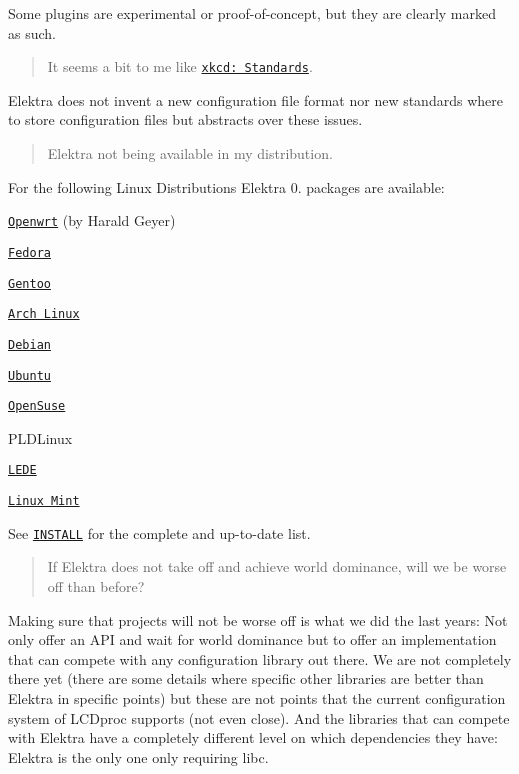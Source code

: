 Some plugins are experimental or proof-\/of-\/concept, but they are clearly marked as such.

\begin{quote}
It seems a bit to me like \href{https://xkcd.com/927/}{\tt xkcd\+: Standards}. \end{quote}


Elektra does not invent a new configuration file format nor new standards where to store configuration files but abstracts over these issues.

\begin{quote}
Elektra not being available in my distribution. \end{quote}


For the following Linux Distributions Elektra 0. packages are available\+:


\begin{DoxyItemize}
\item \href{https://github.com/openwrt/packages/tree/master/libs/elektra}{\tt Openwrt} (by Harald Geyer)
\item \href{https://admin.fedoraproject.org/pkgdb/package/elektra/}{\tt Fedora}
\item \href{http://packages.gentoo.org/package/app-admin/elektra}{\tt Gentoo}
\item \href{https://aur.archlinux.org/packages/elektra/}{\tt Arch Linux}
\item \href{https://packages.debian.org/de/jessie/libelektra4}{\tt Debian}
\item \href{https://launchpad.net/ubuntu/+source/elektra}{\tt Ubuntu}
\item \href{https://software.opensuse.org/package/elektra}{\tt Open\+Suse}
\item P\+L\+D\+Linux
\item \href{https://lede-project.org/packages/pkgdata/libelektra-core?s[]=elektra}{\tt L\+E\+DE}
\item \href{https://community.linuxmint.com/software/view/elektra-bin}{\tt Linux Mint}
\end{DoxyItemize}

See \href{https://www.libelektra.org/docgettingstarted/installation}{\tt I\+N\+S\+T\+A\+LL} for the complete and up-\/to-\/date list.

\begin{quote}
If Elektra does not take off and achieve world dominance, will we be worse off than before? \end{quote}


Making sure that projects will not be worse off is what we did the last years\+: Not only offer an A\+PI and wait for world dominance but to offer an implementation that can compete with any configuration library out there. We are not completely there yet (there are some details where specific other libraries are better than Elektra in specific points) but these are not points that the current configuration system of L\+C\+Dproc supports (not even close). And the libraries that can compete with Elektra have a completely different level on which dependencies they have\+: Elektra is the only one only requiring libc.

